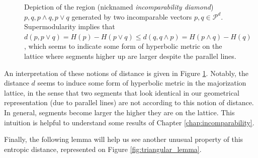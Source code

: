 \begin{figure}[h!]
    \centering
    \caption{Depiction of the region (nicknamed \textit{incomparability diamond}) $p, q, p \wedge q, p \vee q$ generated by two incomparable vectors $p, q \in \mathcal{P}^d$. Supermodularity implies that $d(p, p\vee q) = H(p) - H(p \vee q) \leq d(q, q \wedge p) = H(p \wedge q) - H(q)$, which seems to indicate some form of hyperbolic metric on the lattice where segments higher up are larger despite the parallel lines.} 
    \label{fig:hyperbolic_geometry}
\end{figure}

An interpretation of these notions of distance is given in Figure \ref{fig:hyperbolic_geometry}. Notably, the distance $d$ seems to induce some form of hyperbolic metric in the majorization lattice, in the sense that two segments that look identical in our geometrical representation (due to parallel lines) are not according to this notion of distance. In general, segments become larger the higher they are on the lattice. This intuition is helpful to understand some results of Chapter \ref{chap:incomparability}.

\newpage

Finally, the following lemma will help us see another unusual property of this entropic distance, represented on Figure \ref{fig:triangular_lemma}.

